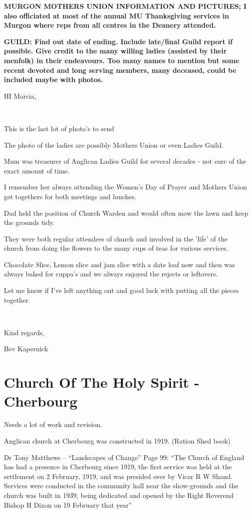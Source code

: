 \textbf{MURGON MOTHERS UNION INFORMATION AND PICTURES; I also officiated
at most of the annual MU Thanksgiving services in Murgon where reps from
all centres in the Deanery attended.}

\textbf{GUILD: Find out date of ending. Include late/final Guild report
if possible. Give credit to the many willing ladies (assisted by their
menfolk) in their endeavours. Too many names to mention but some recent
devoted and long serving members, many deceased, could be included maybe
with photos.}

HI Marcia,

~

This is the last lot of photo's to send

The photo of the ladies are possibly Mothers Union or even Ladies Guild.

Mum was treasurer of Anglican Ladies Guild for several decades - not
sure of the exact amount of time.

I remember her always attending the Women's Day of Prayer and Mothers
Union get togethers for both meetings and lunches.

Dad held the position of Church Warden and would often mow the lawn and
keep the grounds tidy.

They were both regular attendees of church and involved in the 'life' of
the church from doing the flowers to the many cups of teas for various
services.

Chocolate Slice, Lemon slice and jam slice with a date loaf now and then
was always baked for cuppa's and we always enjoyed the rejects or
leftovers.

Let me know if I've left anything out and good luck with putting all the
pieces together.

~

Kind regards,

Bev Kapernick

\section{Church Of The Holy Spirit -
Cherbourg}

Needs a lot of work and revision.

Anglican church at Cherbourg was constructed in 1919. (Ration Shed book)

Dr Tony Matthews -- ``Landscapes of Change'' Page 99: ``The Church of
England has had a presence in Cherbourg since 1919, the first service
was held at the settlement on 2 February, 1919, and was presided over by
Vicar R W Shand. Services were conducted in the community hall near the
show-grounds and the church was built in 1939, being dedicated and
opened by the Right Reverend Bishop H Dixon on 19 February that year''

